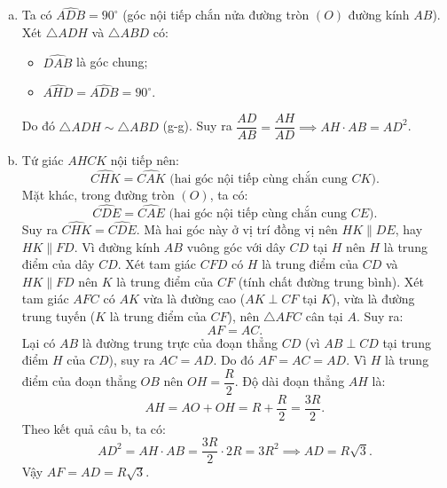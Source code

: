 \begin{bt}
{\begin{enumerate}[a)]
	\item Ta có $\widehat{ADB} = 90^\circ$ (góc nội tiếp chắn nửa đường tròn $(O)$ đường kính $AB$).
	Xét $\triangle ADH$ và $\triangle ABD$ có:
	\begin{itemize}
		\item $\widehat{DAB}$ là góc chung;
		\item $\widehat{AHD} = \widehat{ADB} = 90^\circ$.
	\end{itemize}
	Do đó $\triangle ADH \sim \triangle ABD$ (g-g).
	Suy ra $\dfrac{AD}{AB} = \dfrac{AH}{AD} \implies AH \cdot AB = AD^2$.
	\item Tứ giác $AHCK$ nội tiếp nên:
	$$\widehat{CHK} = \widehat{CAK} \text{ (hai góc nội tiếp cùng chắn cung } CK\text{)}.$$
	Mặt khác, trong đường tròn $(O)$, ta có:
	$$\widehat{CDE} = \widehat{CAE} \text{ (hai góc nội tiếp cùng chắn cung } CE\text{)}.$$
	Suy ra $\widehat{CHK} = \widehat{CDE}$.
	Mà hai góc này ở vị trí đồng vị nên $HK \parallel DE$, hay $HK \parallel FD$.
	Vì đường kính $AB$ vuông góc với dây $CD$ tại $H$ nên $H$ là trung điểm của dây $CD$.
	Xét tam giác $CFD$ có $H$ là trung điểm của $CD$ và $HK \parallel FD$ nên $K$ là trung điểm của $CF$ (tính chất đường trung bình).
	Xét tam giác $AFC$ có $AK$ vừa là đường cao ($AK \perp CF$ tại $K$), vừa là đường trung tuyến ($K$ là trung điểm của $CF$), nên $\triangle AFC$ cân tại $A$.
	Suy ra:
	$$AF = AC.$$
	Lại có $AB$ là đường trung trực của đoạn thẳng $CD$ (vì $AB \perp CD$ tại trung điểm $H$ của $CD$), suy ra $AC = AD$.
	Do đó $AF = AC = AD$.
	Vì $H$ là trung điểm của đoạn thẳng $OB$ nên $OH = \dfrac{R}{2}$.
	Độ dài đoạn thẳng $AH$ là:
	$$AH = AO + OH = R + \dfrac{R}{2} = \dfrac{3R}{2}.$$
	Theo kết quả câu b, ta có:
	$$AD^2 = AH \cdot AB = \dfrac{3R}{2} \cdot 2R = 3R^2 \implies AD = R\sqrt{3}.$$
	Vậy $AF = AD = R\sqrt{3}$.
\end{enumerate}
}
\end{bt}
